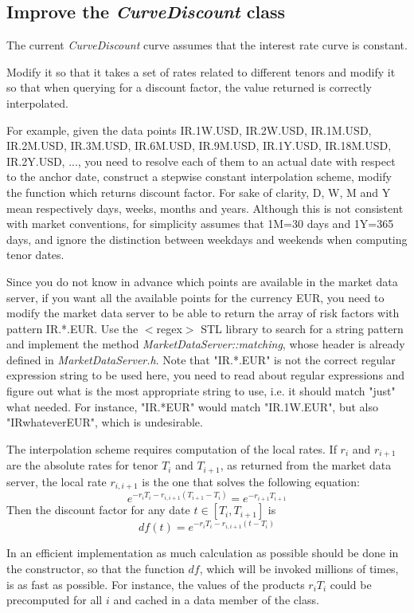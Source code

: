 \documentclass[10pt]{article}
\begin{document}
\subsection{Improve the \textit{CurveDiscount} class}
The current \textit{CurveDiscount} curve assumes that the interest rate curve is constant.

Modify it so that it takes a set of rates related to different tenors and modify it so that when querying for a discount factor, the value returned is correctly interpolated.

For example, given the data points {IR.1W.USD, IR.2W.USD, IR.1M.USD, IR.2M.USD, IR.3M.USD, IR.6M.USD, IR.9M.USD, IR.1Y.USD, IR.18M.USD, IR.2Y.USD, ...}, you need to resolve each of them to an actual date with respect to the anchor date, construct a stepwise constant interpolation scheme, modify the function which returns discount factor. For sake of clarity, D, W, M and Y mean respectively days, weeks, months and years. Although this is not consistent with market conventions, for simplicity assumes that 1M=30 days and 1Y=365 days, and ignore the distinction between weekdays and weekends when computing tenor dates.

Since you do not know in advance which points are available in the market data server, if you want all the available points for the currency EUR, you need to modify the market data server to be able to return the array of risk factors with pattern IR.*.EUR. Use the $<$regex$>$ STL library to search for a string pattern and implement the method \textit{MarketDataServer::matching}, whose header is already defined in \textit{MarketDataServer.h}. Note that "IR.*.EUR" is not the correct regular expression string to be used here, you need to read about regular expressions and figure out what is the most appropriate string to use, i.e. it should match "just" what needed. For instance, "IR.*EUR" would match "IR.1W.EUR", but also "IRwhateverEUR", which is undesirable.

The interpolation scheme requires computation of the local rates. If $r_i$ and $r_{i+1}$ are the absolute rates for tenor $T_i$ and $T_{i+1}$, as returned from the market data server, the local rate $r_{i,i+1}$ is the one that solves the following equation:
$$e^{-r_iT_i-r_{i,i+1}(T_{i+1}-T_i)}=e^{-r_{i+1}T_{i+1}}$$
Then the discount factor for any date $t \in [T_i,T_{i+1}]$ is $$df(t)=e^{-r_i T_i-r_{i,i+1}(t-T_i)}$$

In an efficient implementation as much calculation as possible should be done in the constructor, so that the function $df$, which will be invoked millions of times, is as fast as possible. For instance, the values of the products $r_iT_i$ could be precomputed for all $i$ and cached in a data member of the class.\\
\end{document}

